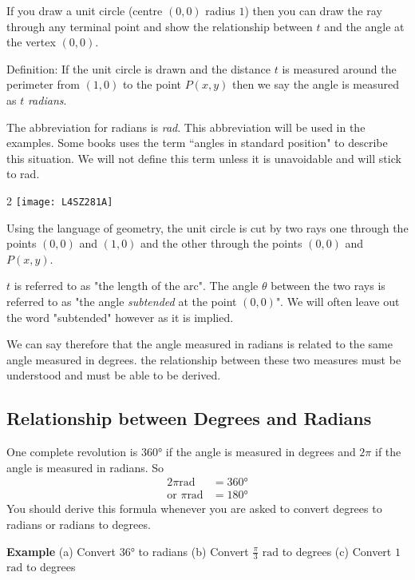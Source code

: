 If you draw a unit circle (centre $\left (0 ,0\right )$ radius $1$) then you can draw the ray through any terminal point and show the relationship between $t$ and the angle at the vertex $\left (0 ,0\right )$. 

Definition: If the unit circle is drawn and the distance $t$ is measured around the perimeter from $\left (1 ,0\right )$ to the point $P (x ,y)$ then we say the angle is measured as $t$ \emph{radians}. 

The abbreviation for radians is \textit{rad}. This abbreviation will be used in the examples.
Some books uses the term ``angles in standard position" to describe this situation. We
will not define this term unless it is unavoidable and will stick to rad.

\columnsep =30pt
\begin {multicols}{2}
\texttt{[image: L4SZ281A]}
\columnbreak

Using the language of geometry, the unit circle is cut by two rays one through the points $\left (0 ,0\right )$ and $\left (1 ,0\right )$ and the other through the points $\left (0 ,0\right )$ and $P \left (x ,y\right )$. 

$t$ is referred to as "the length of the arc". The angle $\theta $ between the two rays is referred to as "the angle \emph{subtended} at the point $\left (0 ,0\right )$". We will often leave out the word "subtended" however as it is implied. 
\end {multicols}
We can say therefore that the angle measured in radians is related to the same angle measured in degrees. the relationship between these two measures must be understood and must be able to be derived. 

\subsection*{Relationship between Degrees and Radians}
One complete revolution is \ang{360} if the angle is measured in degrees and $2 \pi $ if the angle is measured in radians. So
\begin{align*}2 \pi \text{}\mbox{rad} &  =  \ang{360} \\
\text{or\  \ }\pi \text{}\mbox{rad} &  =  \ang{180}
\end{align*}
You should derive this formula whenever you are asked to convert degrees to radians or radians
to degrees. 

\textbf{Example}
(a) Convert \ang{36} to radians 
(b) Convert $\frac{\pi }{3}$ $\mbox{rad}$ to degrees 
(c) Convert $1$ $\mbox{rad}$ to degrees 

